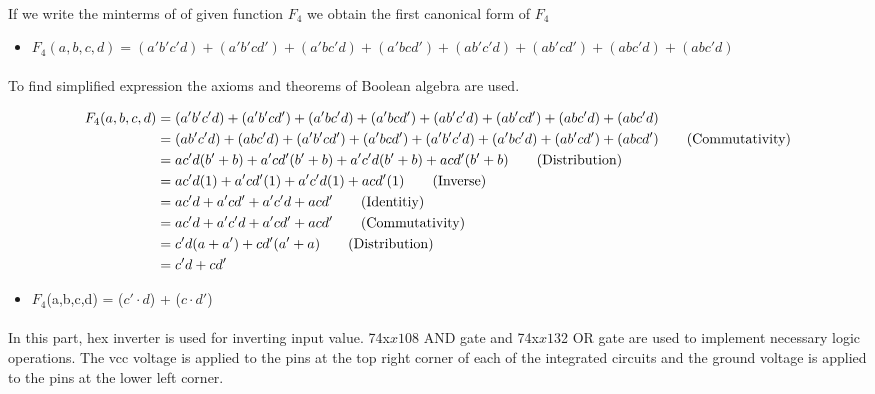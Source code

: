 \documentclass[pdftex,12pt,a4paper]{article}
\begin{document}
\begin{flushleft}
\paragraph{}
If we write the minterms of of given function $F_{4}$ we obtain the first canonical form of $F_{4}$
\begin{itemize}
    \item $F_{4}(a,b,c,d) = (a' b'c' d) + (a' b'   c   d') + (a'   b   c'   d) + (a'   b   c   d') + (a   b'   c'   d) + (a   b'   c   d') + (a   b   c'   d) + (a   b   c'   d)$
\end{itemize}

\paragraph{}
To find simplified expression the axioms and theorems of Boolean algebra are used. 


\begin{align}
F_{4}(a,b,c,d) &= (a' b' c' d) + (a' b'   c   d') + (a'   b   c'   d) + (a'   b   c   d') + (a   b'   c'   d) + (a   b'   c   d') + (a   b   c'   d) + (a   b   c'   d) \notag\\ 
&= (a b' c' d) + (abc'd) + (a'b'cd') + (a'bcd') + (a'   b'   c'   d) + (a'   b   c'   d) + (a   b'   c   d') + (a   b   c   d') \tag{Commutativity} \\
&= ac'd(b' + b) + a'cd'(b'+b) + a'c'd(b' + b) + acd'(b'+b) \tag{Distribution} \\
&= ac'd(1) + a'cd'(1) + a'c'd(1) + acd'(1) \tag{Inverse} \\
&= ac'd + a'cd'+ a'c'd+ acd' \tag{Identitiy} \\
&= ac'd + a'c'd + a'cd' + acd' \tag{Commutativity} \\
&= c'd(a + a') + cd'(a' + a) \tag{Distribution} \\
&= c'd + cd' \notag
\end{align}



\begin{itemize}
    \item $F_{4}$(a,b,c,d) = ($c' \cdot d$) + ($c \cdot d'$)
\end{itemize}

\paragraph{}
In this part, hex inverter is used for inverting input value. 74x$x{1}$08 AND gate and 74x$x{1}$32 OR gate are used to implement necessary logic operations. The vcc voltage is applied to the pins at the top right corner of each of the integrated circuits and the ground voltage is applied to the pins at the lower left corner. 


\end{flushleft}
\end{document}
